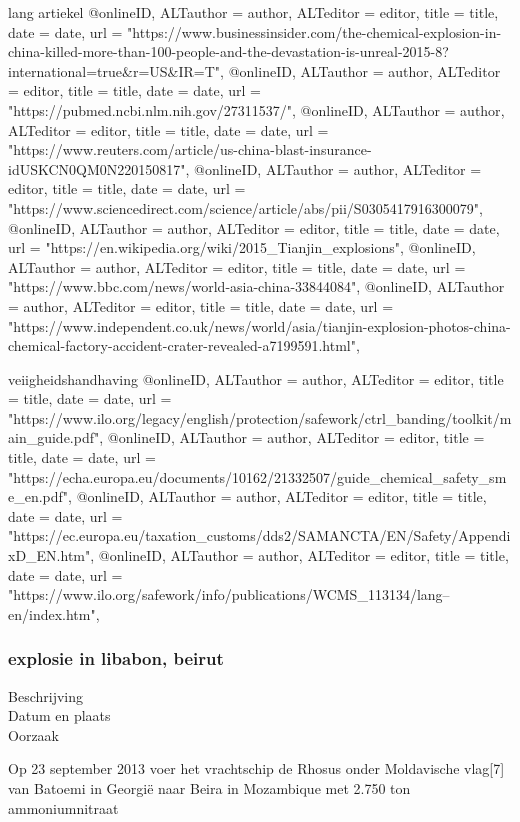 {{{{{{{{{lang artiekel
@online{ID,	ALTauthor = {author},	ALTeditor = {editor},	title = {title},	date = {date},	url = {"https://www.businessinsider.com/the-chemical-explosion-in-china-killed-more-than-100-people-and-the-devastation-is-unreal-2015-8?international=true&r=US&IR=T"},}
@online{ID,	ALTauthor = {author},	ALTeditor = {editor},	title = {title},	date = {date},	url = {"https://pubmed.ncbi.nlm.nih.gov/27311537/"},}
@online{ID,	ALTauthor = {author},	ALTeditor = {editor},	title = {title},	date = {date},	url = {"https://www.reuters.com/article/us-china-blast-insurance-idUSKCN0QM0N220150817"},}
@online{ID,	ALTauthor = {author},	ALTeditor = {editor},	title = {title},	date = {date},	url = {"https://www.sciencedirect.com/science/article/abs/pii/S0305417916300079"},}
@online{ID,	ALTauthor = {author},	ALTeditor = {editor},	title = {title},	date = {date},	url = {"https://en.wikipedia.org/wiki/2015_Tianjin_explosions"},}
@online{ID,	ALTauthor = {author},	ALTeditor = {editor},	title = {title},	date = {date},	url = {"https://www.bbc.com/news/world-asia-china-33844084"},}
@online{ID,	ALTauthor = {author},	ALTeditor = {editor},	title = {title},	date = {date},	url = {"https://www.independent.co.uk/news/world/asia/tianjin-explosion-photos-china-chemical-factory-accident-crater-revealed-a7199591.html"},}

veiigheidshandhaving
@online{ID,	ALTauthor = {author},	ALTeditor = {editor},	title = {title},	date = {date},	url = {"https://www.ilo.org/legacy/english/protection/safework/ctrl_banding/toolkit/main_guide.pdf"},}
@online{ID,	ALTauthor = {author},	ALTeditor = {editor},	title = {title},	date = {date},	url = {"https://echa.europa.eu/documents/10162/21332507/guide_chemical_safety_sme_en.pdf"},}
@online{ID,	ALTauthor = {author},	ALTeditor = {editor},	title = {title},	date = {date},	url = {"https://ec.europa.eu/taxation_customs/dds2/SAMANCTA/EN/Safety/AppendixD_EN.htm"},}
@online{ID,	ALTauthor = {author},	ALTeditor = {editor},	title = {title},	date = {date},	url = {"https://www.ilo.org/safework/info/publications/WCMS_113134/lang--en/index.htm"},}


\subsubsection{explosie in libabon, beirut }
\begin{description}
\item[Beschrijving]
\item[Datum en plaats] 
\item[Oorzaak]
\end{description}
Op 23 september 2013 voer het vrachtschip de Rhosus onder Moldavische vlag[7] van Batoemi in Georgië naar Beira in Mozambique met 2.750 ton ammoniumnitraat

}}}}}}}}}
